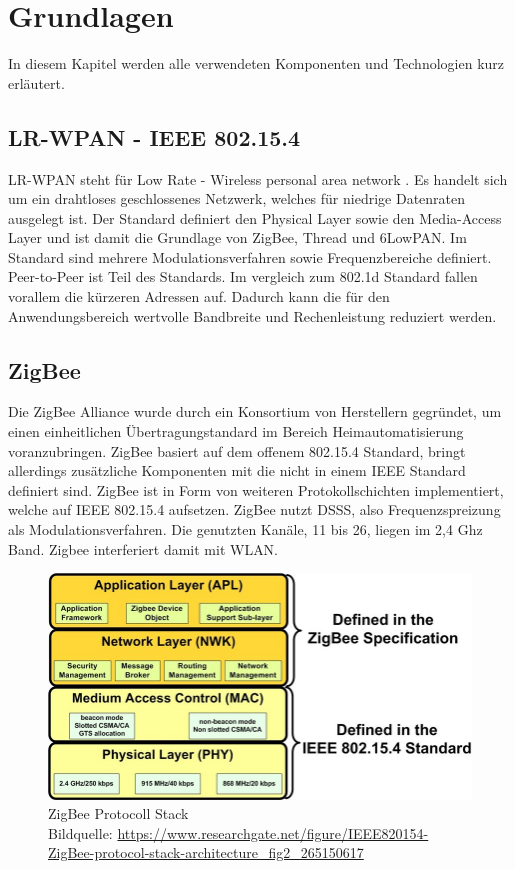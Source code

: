 \chapter{Grundlagen}

In diesem Kapitel werden alle verwendeten Komponenten und Technologien kurz erläutert.

\section{LR-WPAN - IEEE 802.15.4}

LR-WPAN \cite{lrwpan} steht für \grqq Low Rate - Wireless personal area network \grqq{}. Es handelt sich um ein drahtloses geschlossenes Netzwerk, welches für 
niedrige Datenraten ausgelegt ist. Der Standard definiert den Physical Layer sowie den Media-Access Layer und ist damit die Grundlage von ZigBee, Thread und 6LowPAN.
Im Standard sind mehrere Modulationsverfahren sowie Frequenzbereiche definiert. Peer-to-Peer ist Teil des Standards. Im vergleich zum 802.1d Standard fallen 
vorallem die kürzeren Adressen auf. Dadurch kann die für den Anwendungsbereich wertvolle Bandbreite und Rechenleistung reduziert werden. 

\section{ZigBee}

Die ZigBee Alliance wurde durch ein Konsortium von Herstellern gegründet, um einen einheitlichen Übertragungstandard
im Bereich Heimautomatisierung voranzubringen. ZigBee basiert auf dem offenem 802.15.4 Standard, bringt allerdings zusätzliche Komponenten mit die nicht in einem IEEE
Standard definiert sind.
ZigBee ist in Form von weiteren Protokollschichten implementiert, welche auf IEEE 802.15.4 aufsetzen. ZigBee nutzt DSSS, also Frequenzspreizung als Modulationsverfahren.
Die genutzten Kanäle, 11 bis 26, liegen im 2,4 Ghz Band. Zigbee interferiert damit mit WLAN.

\begin{figure}[H]
  \centering
  \includegraphics[width=1\textwidth]{media/Zigbee Stack.jpg}
  \caption{ZigBee Protocoll Stack \\ Bildquelle: \url{https://www.researchgate.net/figure/IEEE820154-ZigBee-protocol-stack-architecture_fig2_265150617}}
\end{figure}

